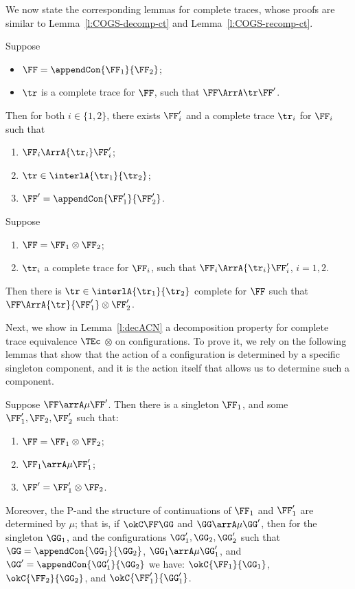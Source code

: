 \noindent
We now state the corresponding lemmas for complete traces,
whose proofs are similar to Lemma~\ref{l:COGS-decomp-ct} and Lemma~\ref{l:COGS-recomp-ct}.
\begin{lemma}
\label{l:AOGS-decomp-ct}
Suppose
\begin{itemize}
  \item $\FF  = \appendCon{\FF_1}{\FF_2}$;
  \item $\tr$ is a complete trace for $\FF$,
  such that $\FF \ArrA \tr \FF'$.
\end{itemize} 
Then for both $i \in \{1,2\}$,
there exists $\FF_i'$ and a complete trace $\tr_i$
for $\FF_i$ such that 
\begin{enumerate}
  \item ${\FF_i} \ArrA{\tr_i} \FF_i'$;
  \item $\tr \in \interlA{\tr_1}{\tr_2}$; 
  \item $\FF' = \appendCon{\FF'_1}{\FF'_2}$.
\end{enumerate}
\end{lemma}              

\begin{lemma}
  \label{l:AOGS-recomp-ct}
  Suppose 
  \begin{enumerate}
    \item $\FF = \FF_1 \otimes \FF_2$;   
    \item $\tr_i$ a complete trace for $\FF_i$,
    such that $\FF_i \ArrA{\tr_i} \FF_i'$,
    $i=1,2$. 
  \end{enumerate} 
  Then there is 
   $\tr \in \interlA{\tr_1}{\tr_2}$ complete for $\FF$ such that
  $\FF \ArrA{\tr}{\FF'_1} \otimes {\FF'_2}$. 
\end{lemma}
\noindent
Next, we show in Lemma~\ref{l:decACN} a decomposition property for 
complete trace equivalence $\TEc$ \wrt $\otimes$ on configurations.
%
To prove it, we rely on the following lemmas
that show that the action of a configuration is 
determined by a specific singleton component, 
and it is the action itself that allows us to determine such a component.

\begin{lemma}
\label{l:decNsig}
Suppose $\FF \arrA\mu \FF'$.
Then there is a singleton $\FF_1$, and some $\FF_1',\FF_2,\FF_2'$ 
such that:
\begin{enumerate}
\item $\FF =
 {\FF_1} \otimes {\FF_2}$;
\item $\FF_1 \arrA\mu \FF_1'$;
\item $\FF' =
 {\FF_1'} \otimes {\FF_2}$.
\end{enumerate}
\noindent
Moreover, the P-\Supports and the structure of continuations of $\FF_1$ and $\FF_1'$  
are determined by 
$\mu$; that is, 
if  $\okC \FF\GG$ and
 $\GG \arrA\mu \GG'$, then for  
 the singleton $\GG_1$, and the configurations $\GG_1',\GG_2,\GG_2'$ such that
 $\GG = \appendCon{\GG_1}{\GG_2}$,
 $\GG_1 \arrA\mu \GG_1'$, and 
 $\GG' = \appendCon{\GG_1'}{\GG_2}$ we have: 
 $\okC{\FF_1}{\GG_1}$, $\okC{\FF_2}{\GG_2}$, and 
$\okC{\FF_1'}{\GG_1'}$.  
 \end{lemma} 

